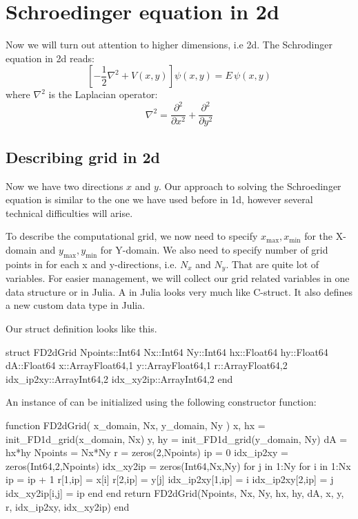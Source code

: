 \section{Schroedinger equation in 2d}

Now we will turn out attention to higher dimensions, i.e 2d.
The Schrodinger equation in 2d reads:
\begin{equation}
\left[ -\frac{1}{2}\nabla^2 + V(x,y) \right] \psi(x,y) = E\,\psi(x,y)
\label{eq:sch_2d}
\end{equation}
%
where $\nabla^2$ is the Laplacian operator:
\begin{equation}
\nabla^2 = \frac{\partial^2}{\partial x^2} + \frac{\partial^2}{\partial y^2}
\end{equation}

\subsection{Describing grid in 2d}

Now we have two directions $x$ and $y$. Our approach to solving the Schroedinger equation
is similar to the one we have used before in 1d, however several technical difficulties
will arise.

To describe the computational grid, we now need to specify $x_{\mathrm{max}}, x_{\mathrm{min}}$ for the X-domain
and $y_{\mathrm{max}}, y_{\mathrm{min}}$ for Y-domain. We also need to specify number of grid
points in for each x and y-directions, i.e. $N_{x}$ and $N_{y}$. That are quite lot of variables.
For easier management, we will collect our grid related variables in one data structure or
 in Julia. A  in Julia looks very much like C-struct.
It also defines a new custom data type in Julia.

Our struct definition looks like this.
\begin{juliacode}
struct FD2dGrid
    Npoints::Int64
    Nx::Int64
    Ny::Int64
    hx::Float64
    hy::Float64
    dA::Float64
    x::Array{Float64,1}
    y::Array{Float64,1}
    r::Array{Float64,2}
    idx_ip2xy::Array{Int64,2}
    idx_xy2ip::Array{Int64,2}
end
\end{juliacode}
%
An instance of  can be initialized using the following constructor function:
%
\begin{juliacode}
function FD2dGrid( x_domain, Nx, y_domain, Ny )
    x, hx = init_FD1d_grid(x_domain, Nx)
    y, hy = init_FD1d_grid(y_domain, Ny)
    dA = hx*hy
    Npoints = Nx*Ny
    r = zeros(2,Npoints)
    ip = 0
    idx_ip2xy = zeros(Int64,2,Npoints)
    idx_xy2ip = zeros(Int64,Nx,Ny)
    for j in 1:Ny
        for i in 1:Nx
            ip = ip + 1
            r[1,ip] = x[i]
            r[2,ip] = y[j]
            idx_ip2xy[1,ip] = i
            idx_ip2xy[2,ip] = j
            idx_xy2ip[i,j] = ip
        end
    end
    return FD2dGrid(Npoints, Nx, Ny, hx, hy, dA, x, y, r, idx_ip2xy, idx_xy2ip) 
end
\end{juliacode}

